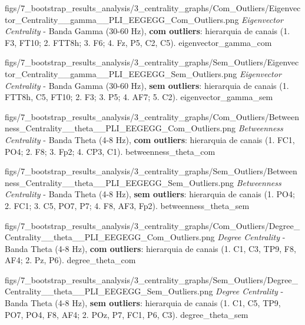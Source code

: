\ultrawidefigure
{figs/7_bootstrap_results_analysis/3_centrality_graphs/Com_Outliers/Eigenvector_Centrality__gamma__PLI_EEGEGG_Com_Outliers.png}
{\textit{Eigenvector Centrality} - Banda Gamma (30-60 Hz), \textbf{com outliers}: hierarquia de canais (1. F3, FT10; 2. FTT8h; 3. F6; 4. Fz, P5, C2, C5).}
{eigenvector_gamma_com}

\ultrawidefigure
{figs/7_bootstrap_results_analysis/3_centrality_graphs/Sem_Outliers/Eigenvector_Centrality__gamma__PLI_EEGEGG_Sem_Outliers.png}
{\textit{Eigenvector Centrality} - Banda Gamma (30-60 Hz), \textbf{sem outliers}: hierarquia de canais (1. FTT8h, C5, FT10; 2. F3; 3. P5; 4. AF7; 5. C2).}
{eigenvector_gamma_sem}


\ultrawidefigure
{figs/7_bootstrap_results_analysis/3_centrality_graphs/Com_Outliers/Betweenness_Centrality__theta__PLI_EEGEGG_Com_Outliers.png}
{\textit{Betweenness Centrality} - Banda Theta (4-8 Hz), \textbf{com outliers}: hierarquia de canais (1. FC1, PO4; 2. F8; 3. Fp2; 4. CP3, C1).}
{betweenness_theta_com}

\ultrawidefigure
{figs/7_bootstrap_results_analysis/3_centrality_graphs/Sem_Outliers/Betweenness_Centrality__theta__PLI_EEGEGG_Sem_Outliers.png}
{\textit{Betweenness Centrality} - Banda Theta (4-8 Hz), \textbf{sem outliers}: hierarquia de canais (1. PO4; 2. FC1; 3. C5, PO7, P7; 4. F8, AF3, Fp2).}
{betweenness_theta_sem}


\ultrawidefigure
{figs/7_bootstrap_results_analysis/3_centrality_graphs/Com_Outliers/Degree_Centrality__theta__PLI_EEGEGG_Com_Outliers.png}
{\textit{Degree Centrality} - Banda Theta (4-8 Hz), \textbf{com outliers}: hierarquia de canais (1. C1, C3, TP9, F8, AF4; 2. Pz, P6).}
{degree_theta_com}

\ultrawidefigure
{figs/7_bootstrap_results_analysis/3_centrality_graphs/Sem_Outliers/Degree_Centrality__theta__PLI_EEGEGG_Sem_Outliers.png}
{\textit{Degree Centrality} - Banda Theta (4-8 Hz), \textbf{sem outliers}: hierarquia de canais (1. C1, C5, TP9, PO7, PO4, F8, AF4; 2. POz, P7, FC1, P6, C3).}
{degree_theta_sem}

